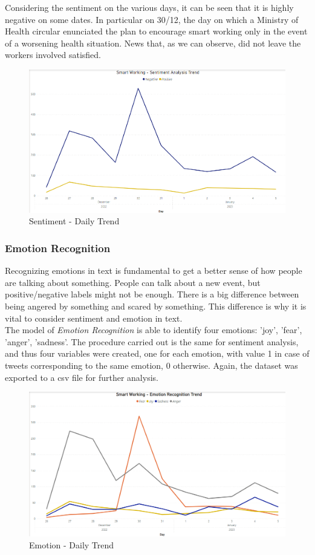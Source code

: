 \documentclass[12pt,journal,compsoc]{IEEEtran}
\begin{document}
Considering the sentiment on the various days, it can be seen that it is highly negative on some dates. In particular on 30/12, the day on which a Ministry of Health circular enunciated the plan to encourage smart working only in the event of a worsening health situation. News that, as we can observe, did not leave the workers involved satisfied.

\begin{figure}[H]
  \includegraphics[scale=0.5]{./images/trend-sentiment.png}
  \caption{Sentiment - Daily Trend}
\end{figure}

\subsubsection{Emotion Recognition}
Recognizing emotions in text is fundamental to get a better sense of how people are talking about something. People can talk about a new event, but positive/negative labels might not be enough. There is a big difference between being angered by something and scared by something. This difference is why it is vital to consider sentiment and emotion in text.\\
The model of \textit{Emotion Recognition} is able to identify four emotions: 'joy', 'fear', 'anger', 'sadness'. The procedure carried out is the same for sentiment analysis, and thus four variables were created, one for each emotion, with value 1 in case of tweets corresponding to the same emotion, 0 otherwise. Again, the dataset was exported to a csv file for further analysis.

\begin{figure}[H]
  \includegraphics[scale=0.5]{./images/trend-emotion.png}
  \caption{Emotion - Daily Trend}
\end{figure}
\end{document}
